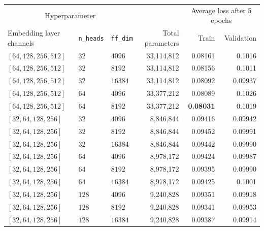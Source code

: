 \begin{table}[H]
  \centering
  \begin{adjustbox}{width=\textwidth}
    \begin{tabular}{lll|rrr}

      \multicolumn{3}{c}{Hyperparameter} && \multicolumn{2}{c}{Average loss
      after 5 epochs} \\

      Embedding layer channels & \texttt{n\_heads} & \texttt{ff\_dim} & Total
      parameters & Train & Validation\\

      \hline

      $[64, 128, 256, 512 ]$& $32$ & $4096$ & 33,114,812 & 0.08161 & 0.1016   \\
      $[64, 128, 256, 512 ]$& $32$ & $8192$ & 33,114,812 & 0.08156 & 0.1011 \\
      $[64, 128, 256, 512 ]$& $32$ & $16384$ & 33,114,812 & 0.08092 & 0.09937 \\[0.1cm]

      $[64, 128, 256, 512 ]$& $64$ & $4096$ & 33,377,212 & 0.08089 & 0.1026 \\
      $[64, 128, 256, 512 ]$& $64$ & $8192$ & 33,377,212 & \textbf{0.08031} & 0.1019 \\ [0.5cm]

      $[32, 64, 128, 256 ]$& $32$ & $4096$ & 8,846,844 & 0.09416 & 0.09942 \\
      $[32, 64, 128, 256 ]$& $32$ & $8192$ & 8,846,844 & 0.09452 & 0.09991 \\
      $[32, 64, 128, 256 ]$& $32$ & $16384$ & 8,846,844 & 0.09442 & 0.09990 \\[0.1cm]

      $[32, 64, 128, 256 ]$& $64$ & $4096$ & 8,978,172 & 0.09424 & 0.09987 \\
      $[32, 64, 128, 256 ]$& $64$ & $8192$ & 8,978,172 & 0.09395 & 0.09990 \\
      $[32, 64, 128, 256 ]$& $64$ & $16384$ & 8,978,172 & 0.09425 & 0.1001 \\[0.1cm]

      $[32, 64, 128, 256 ]$& $128$ & $4096$ & 9,240,828 & 0.09351 & 0.09918 \\
      $[32, 64, 128, 256 ]$& $128$ & $8192$ & 9,240,828 & 0.09341 & 0.09953 \\
      $[32, 64, 128, 256 ]$& $128$ & $16384$ & 9,240,828 & 0.09387 & 0.09914 \\[0.5cm]


\end{tabular}
\end{adjustbox}
\end{table}
